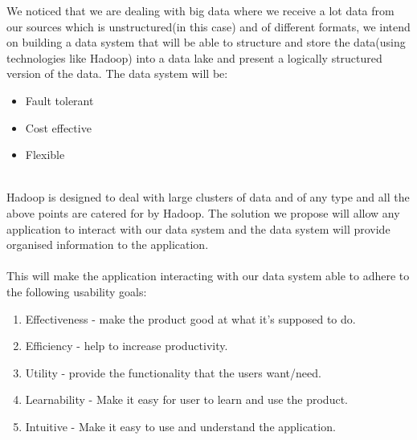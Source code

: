 We noticed that we are dealing with big data where we receive a lot data from our sources which is
unstructured(in this case) and of different formats, we intend on building a data system that will
be able to structure and store the data(using technologies like Hadoop) into a data lake and present
a logically structured version of the data.
\newline
The data system will be:
\begin{itemize}
	\item  Fault tolerant 
	\item  Cost effective
	\item  Flexible
\end{itemize}

\newline \\
Hadoop is designed to deal with large clusters of data and of any type and all the above points are catered for by Hadoop.
\newline 
The solution we propose will allow any application to interact with our data system and the data system will provide organised information to the application.
\newline \\ \\
This will make the application interacting with our data system able to adhere to the following usability goals:
\\
\begin{enumerate}
    \item Effectiveness - make the product good at what it’s supposed to do.
    \item Efficiency - help to increase productivity.
    \item Utility - provide the functionality that the users
    want/need.
    \item Learnability - Make it easy for user to learn and use the product.
    \item Intuitive - Make it easy to use and understand the application.
    
\end{enumerate}
